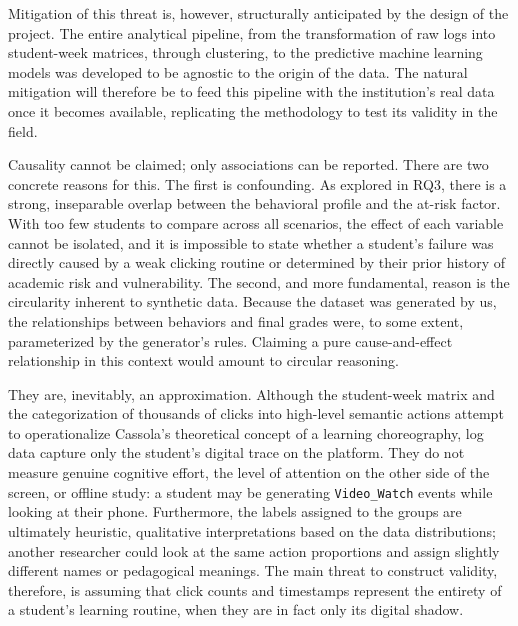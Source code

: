 Mitigation of this threat is, however, structurally anticipated by the design of the project. The entire analytical pipeline, from the transformation of raw logs into student-week matrices, through clustering, to the predictive machine learning models was developed to be agnostic to the origin of the data. The natural mitigation will therefore be to feed this pipeline with the institution's real data once it becomes available, replicating the methodology to test its validity in the field.

Causality cannot be claimed; only associations can be reported. There are two concrete reasons for this. The first is confounding. As explored in RQ3, there is a strong, inseparable overlap between the behavioral profile and the at-risk factor. With too few students to compare across all scenarios, the effect of each variable cannot be isolated, and it is impossible to state whether a student's failure was directly caused by a weak clicking routine or determined by their prior history of academic risk and vulnerability. The second, and more fundamental, reason is the circularity inherent to synthetic data. Because the dataset was generated by us, the relationships between behaviors and final grades were, to some extent, parameterized by the generator's rules. Claiming a pure cause-and-effect relationship in this context would amount to circular reasoning.

They are, inevitably, an approximation. Although the student-week matrix and the categorization of thousands of clicks into high-level semantic actions attempt to operationalize Cassola's theoretical concept of a learning choreography, log data capture only the student's digital trace on the platform. They do not measure genuine cognitive effort, the level of attention on the other side of the screen, or offline study: a student may be generating \texttt{Video\_Watch} events while looking at their phone. Furthermore, the labels assigned to the groups are ultimately heuristic, qualitative interpretations based on the data distributions; another researcher could look at the same action proportions and assign slightly different names or pedagogical meanings. The main threat to construct validity, therefore, is assuming that click counts and timestamps represent the entirety of a student's learning routine, when they are in fact only its digital shadow.

